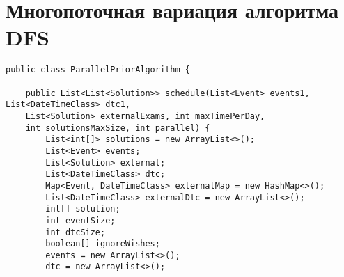 \chapter{Многопоточная вариация алгоритма DFS}\label{appendix-parallel}	

\begin{lstlisting}
public class ParallelPriorAlgorithm {
	
	public List<List<Solution>> schedule(List<Event> events1, List<DateTimeClass> dtc1,
	List<Solution> externalExams, int maxTimePerDay,
	int solutionsMaxSize, int parallel) {
		List<int[]> solutions = new ArrayList<>();
		List<Event> events;
		List<Solution> external;
		List<DateTimeClass> dtc;
		Map<Event, DateTimeClass> externalMap = new HashMap<>();
		List<DateTimeClass> externalDtc = new ArrayList<>();
		int[] solution;
		int eventSize;
		int dtcSize;
		boolean[] ignoreWishes;
		events = new ArrayList<>();
		dtc = new ArrayList<>();
		

\end{lstlisting}
